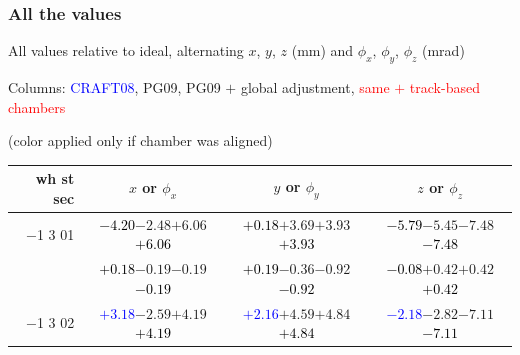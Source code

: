 \documentclass[compress]{beamer}
\begin{document}
\begin{frame}
\frametitle{All the values}
\tiny

All values relative to ideal, alternating $x$, $y$, $z$ (mm) and $\phi_x$, $\phi_y$, $\phi_z$ (mrad)

Columns: \textcolor{blue}{CRAFT08}, PG09, PG09 $+$ global adjustment, \textcolor{red}{same $+$ track-based chambers}

\hfill (color applied only if chamber was aligned)

\vfill
\renewcommand{\arraystretch}{1.1}
\begin{tabular}{r | c | c | c}
wh st sec & $x$ or $\phi_x$ & $y$ or $\phi_y$ & $z$ or $\phi_z$ \\\hline
$-$1 3 01 & \textcolor{black}{$-4.20$}\hspace{0.1 cm}$-2.48$\hspace{0.1 cm}$+6.06$\hspace{0.1 cm}\textcolor{black}{$+6.06$} & \textcolor{black}{$+0.18$}\hspace{0.1 cm}$+3.69$\hspace{0.1 cm}$+3.93$\hspace{0.1 cm}\textcolor{black}{$+3.93$} & \textcolor{black}{$-5.79$}\hspace{0.1 cm}$-5.45$\hspace{0.1 cm}$-7.48$\hspace{0.1 cm}\textcolor{black}{$-7.48$} \\
          & \textcolor{black}{$+0.18$}\hspace{0.1 cm}$-0.19$\hspace{0.1 cm}$-0.19$\hspace{0.1 cm}\textcolor{black}{$-0.19$} & \textcolor{black}{$+0.19$}\hspace{0.1 cm}$-0.36$\hspace{0.1 cm}$-0.92$\hspace{0.1 cm}\textcolor{black}{$-0.92$} & \textcolor{black}{$-0.08$}\hspace{0.1 cm}$+0.42$\hspace{0.1 cm}$+0.42$\hspace{0.1 cm}\textcolor{black}{$+0.42$} \\
$-$1 3 02 & \textcolor{blue}{$+3.18$}\hspace{0.1 cm}$-2.59$\hspace{0.1 cm}$+4.19$\hspace{0.1 cm}\textcolor{black}{$+4.19$} & \textcolor{blue}{$+2.16$}\hspace{0.1 cm}$+4.59$\hspace{0.1 cm}$+4.84$\hspace{0.1 cm}\textcolor{black}{$+4.84$} & \textcolor{blue}{$-2.18$}\hspace{0.1 cm}$-2.82$\hspace{0.1 cm}$-7.11$\hspace{0.1 cm}\textcolor{black}{$-7.11$} \\

\end{tabular}
\end{frame}
\end{document}
